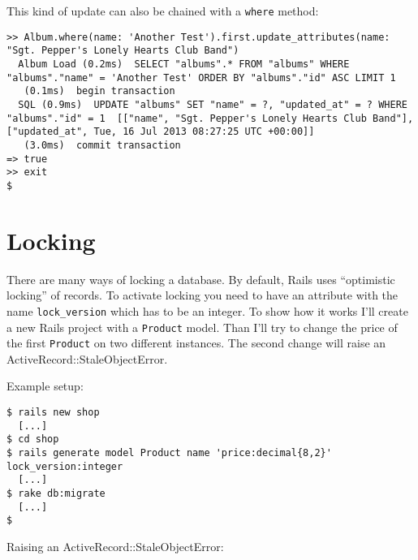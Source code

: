 \documentclass[a4paper]{book}
\newcounter{tab}[chapter]
\newcommand{\chap}[1]{\newpage\thispagestyle{empty}\chapter{#1}\label{chap:\thechapter}}
\begin{document}
This kind of update can also be chained with a \texttt{where} method:

\begin{shaded}\begin{verbatim}
>> Album.where(name: 'Another Test').first.update_attributes(name: "Sgt. Pepper's Lonely Hearts Club Band")
  Album Load (0.2ms)  SELECT "albums".* FROM "albums" WHERE "albums"."name" = 'Another Test' ORDER BY "albums"."id" ASC LIMIT 1
   (0.1ms)  begin transaction
  SQL (0.9ms)  UPDATE "albums" SET "name" = ?, "updated_at" = ? WHERE "albums"."id" = 1  [["name", "Sgt. Pepper's Lonely Hearts Club Band"], ["updated_at", Tue, 16 Jul 2013 08:27:25 UTC +00:00]]
   (3.0ms)  commit transaction
=> true
>> exit
$
\end{verbatim}\end{shaded}

\chap{Locking}\label{locking}

There are many ways of locking a database. By default, Rails uses “optimistic locking” of records. To activate locking you need to have an attribute with the name \texttt{lock\_version} which has to be an integer. To show how it works I'll create a new Rails project with a \texttt{Product} model. Than I'll try to change the price of the first \texttt{Product} on two different instances. The second change will raise an ActiveRecord::StaleObjectError.

Example setup:

\begin{shaded}\begin{verbatim}
$ rails new shop
  [...]
$ cd shop
$ rails generate model Product name 'price:decimal{8,2}' lock_version:integer
  [...]
$ rake db:migrate
  [...]
$
\end{verbatim}\end{shaded}

Raising an ActiveRecord::StaleObjectError:
\end{document}
